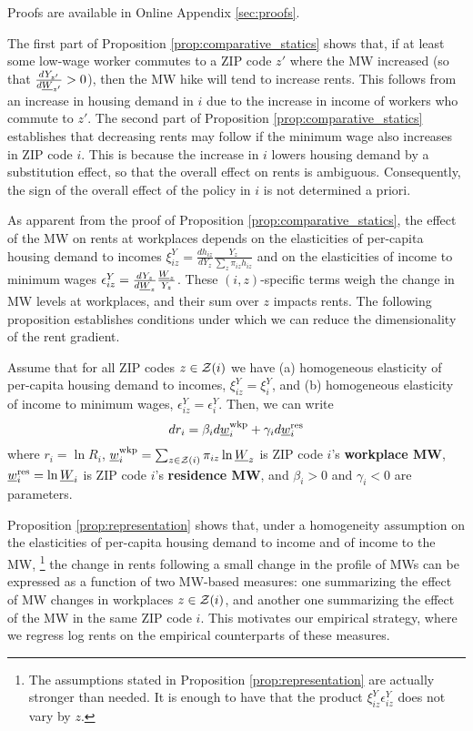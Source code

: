 Proofs are available in Online Appendix \ref{sec:proofs}.

The first part of Proposition \ref{prop:comparative_statics} shows that,
if at least some low-wage worker commutes to a ZIP code $z'$ where the MW 
increased  (so that $\frac{d Y_{z'}}{d \underline{W}_{z'}}>0$),
then the MW hike will tend to increase rents.
This follows from an increase in housing demand in $i$ due to the increase in
income of workers who commute to $z'$.
The second part of Proposition \ref{prop:comparative_statics} establishes that 
decreasing rents may follow if the minimum wage also increases in ZIP code $i$.
This is because the increase in $i$ lowers housing demand by a substitution
effect, so that the overall effect on rents is ambiguous.
Consequently, the sign of the overall effect of the policy in $i$ is not 
determined a priori.

As apparent from the proof of Proposition \ref{prop:comparative_statics}, 
the effect of the MW on rents at workplaces depends on the elasticities of 
per-capita housing demand to incomes
$\xi^Y_{iz} = \frac{d h_{iz}}{d Y_z} \frac{Y_z}{\sum_z \pi_{iz} h_{iz}}$ and
on the elasticities of income to minimum wages
$\epsilon_{iz}^Y = \frac{d Y_z}{d \underline{W}_z} \frac{\underline{W}_z}{Y_z}$.
These $(i,z)$-specific terms weigh the change in MW levels at workplaces,
and their sum over $z$ impacts rents.
The following proposition establishes conditions under which we can reduce the 
dimensionality of the rent gradient.

\begin{prop}[Representation]\label{prop:representation}
    Assume that for all ZIP codes $z\in\mathcal{Z}(i)$ we have
    (a) homogeneous elasticity of per-capita housing demand to incomes,
    $\xi^Y_{iz}=\xi^Y_{i}$, and
    (b) homogeneous elasticity of income to minimum wages,
    $\epsilon_{iz}^Y=\epsilon_i^Y$.
    Then, we can write
    \begin{equation} \label{eq:theory_representation}
        d r_i = \beta_i  d \underline{w}^{\text{wkp}}_i
              + \gamma_i d \underline{w}^{\text{res}}_i
    \end{equation}
    where 
    $r_{i} = \ln R_i$,
    $\underline{w}_{i}^{\text{wkp}} = \sum_{z\in\mathcal{Z}(i)} \pi_{iz} \ln \underline{W}_z$ 
    is ZIP code $i$'s \textbf{workplace MW}, 
    $\underline{w}^{\text{res}}_i = \ln \underline{W}_i$ 
    is ZIP code $i$'s \textbf{residence MW}, and 
    $\beta_i > 0$ and $\gamma_i < 0$ are parameters.
\end{prop}

Proposition \ref{prop:representation} shows that, under a homogeneity assumption
on the elasticities of per-capita housing demand to income and 
of income to the MW,%
\footnote{The assumptions stated in Proposition \ref{prop:representation} are 
actually stronger than needed.
It is enough to have that the product $\xi^Y_{iz} \epsilon_{iz}^Y$ does not vary 
by $z$.}
the change in rents following a small change in the profile of MWs can be 
expressed as a function of two MW-based measures:
one summarizing the effect of MW changes in workplaces $z\in\mathcal{Z}(i)$,
and another one summarizing the effect of the MW in the same ZIP code $i$.
This motivates our empirical strategy, where we regress log rents on the 
empirical counterparts of these measures.

